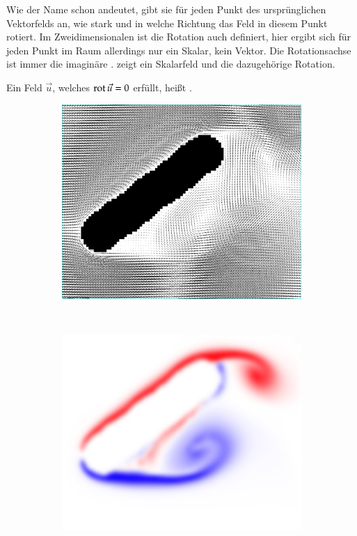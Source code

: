 Wie der Name schon andeutet, gibt sie für jeden Punkt des
ursprünglichen Vektorfelds an, wie stark und in welche Richtung das
Feld in diesem Punkt rotiert. Im Zweidimensionalen ist die Rotation
auch definiert, hier ergibt sich für jeden Punkt im Raum allerdings
nur ein Skalar, kein Vektor. Die Rotationsachse ist immer die
imaginäre
. 
zeigt ein Skalarfeld und die dazugehörige Rotation.

Ein Feld $\vec{u}$, welches $\operatorname*{rot} \vec{u}=0$ erfüllt, heißt
.

\begin{figure}
	\begin{subfigure}[b]{0.5\textwidth}
		\centering
		\includegraphics[width=\textwidth]{images/vector_field_rotation_arrows}
\label{fig:mathematics_image_vectorfield_rotation_arrows}
	\end{subfigure}
~
	\begin{subfigure}[b]{0.5\textwidth}
		\centering
		\includegraphics[width=\textwidth]{images/vector_field_rotation}

\end{subfigure}
\end{figure}
